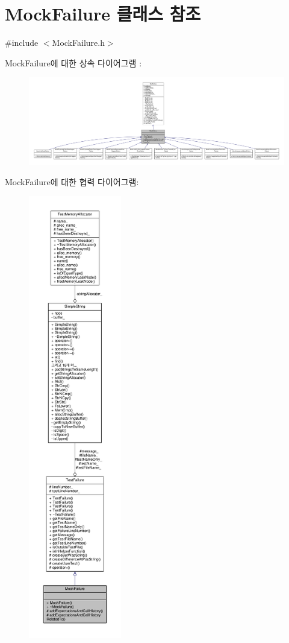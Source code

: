 \hypertarget{class_mock_failure}{}\section{Mock\+Failure 클래스 참조}
\label{class_mock_failure}


{\ttfamily \#include $<$Mock\+Failure.\+h$>$}



Mock\+Failure에 대한 상속 다이어그램 \+: 
\nopagebreak
\begin{figure}[H]
\begin{center}
\leavevmode
\includegraphics[width=350pt]{class_mock_failure__inherit__graph}
\end{center}
\end{figure}


Mock\+Failure에 대한 협력 다이어그램\+:
\nopagebreak
\begin{figure}[H]
\begin{center}
\leavevmode
\includegraphics[height=550pt]{class_mock_failure__coll__graph}
\end{center}
\end{figure}
